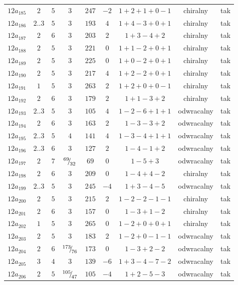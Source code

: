 \begin{longtable}{ccccccccc}
$12a_{185}$ & $2$ & $5$ & $3$ & $247$ & $-2$ & $1+2+1+0-1$ & chiralny & tak \\
$12a_{186}$ & $2..3$ & $5$ & $3$ & $193$ & $4$ & $1+4-3+0+1$ & chiralny & tak \\
$12a_{187}$ & $2$ & $6$ & $3$ & $203$ & $2$ & $1+3-4+2$ & chiralny & tak \\
$12a_{188}$ & $2$ & $5$ & $3$ & $221$ & $0$ & $1+1-2+0+1$ & chiralny & tak \\
$12a_{189}$ & $2$ & $5$ & $3$ & $225$ & $0$ & $1+0-2+0+1$ & chiralny & tak \\
$12a_{190}$ & $2$ & $5$ & $3$ & $217$ & $4$ & $1+2-2+0+1$ & chiralny & tak \\
$12a_{191}$ & $1$ & $5$ & $3$ & $263$ & $2$ & $1+2+0+0-1$ & chiralny & tak \\
$12a_{192}$ & $2$ & $6$ & $3$ & $179$ & $2$ & $1+1-3+2$ & chiralny & tak \\
$12a_{193}$ & $2..3$ & $5$ & $3$ & $105$ & $4$ & $1-2-6+1+1$ & odwracalny & tak \\
$12a_{194}$ & $2$ & $6$ & $3$ & $163$ & $2$ & $1-3-3+2$ & odwracalny & tak \\
$12a_{195}$ & $2..3$ & $5$ & $4$ & $141$ & $4$ & $1-3-4+1+1$ & odwracalny & tak \\
$12a_{196}$ & $2..3$ & $6$ & $3$ & $127$ & $2$ & $1-4-1+2$ & odwracalny & tak \\
$12a_{197}$ & $2$ & $7$ & ${}^{69}{\mskip -5mu/\mskip -3mu}_{32}$ & $69$ & $0$ & $1-5+3$ & odwracalny & tak \\
$12a_{198}$ & $2$ & $6$ & $3$ & $209$ & $0$ & $1-4+4-2$ & chiralny & tak \\
$12a_{199}$ & $2..3$ & $5$ & $3$ & $245$ & $-4$ & $1+3-4-5$ & odwracalny & tak \\
$12a_{200}$ & $2$ & $5$ & $3$ & $215$ & $2$ & $1-2-2-1-1$ & chiralny & tak \\
$12a_{201}$ & $2$ & $6$ & $3$ & $157$ & $0$ & $1-3+1-2$ & chiralny & tak \\
$12a_{202}$ & $1$ & $5$ & $3$ & $265$ & $0$ & $1-2+0+0+1$ & chiralny & tak \\
$12a_{203}$ & $2$ & $5$ & $3$ & $183$ & $2$ & $1-2+0-1-1$ & odwracalny & tak \\
$12a_{204}$ & $2$ & $6$ & ${}^{173}{\mskip -5mu/\mskip -3mu}_{76}$ & $173$ & $0$ & $1-3+2-2$ & odwracalny & tak \\
$12a_{205}$ & $3$ & $4$ & $3$ & $139$ & $-6$ & $1+3-4-7-2$ & odwracalny & tak \\
$12a_{206}$ & $2$ & $5$ & ${}^{105}{\mskip -5mu/\mskip -3mu}_{47}$ & $105$ & $-4$ & $1+2-5-3$ & odwracalny & tak \\

\end{longtable}
